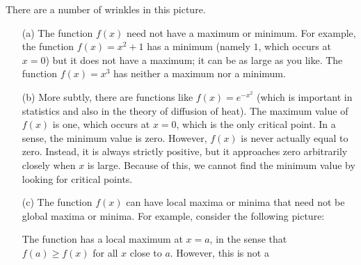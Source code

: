\documentclass[reqno]{amsart}
\theoremstyle{definition}
\begin{document}
There are a number of wrinkles in this picture.
\begin{itemize}
 \item[(a)] The function $f(x)$ need not have a maximum or minimum.
  For example, the function $f(x)=x^2+1$ has a minimum (namely $1$,
  which occurs at $x=0$) but it does not have a maximum; it can be as
  large as you like.  The function $f(x)=x^3$ has neither a maximum
  nor a minimum.
 \item[(b)] More subtly, there are functions like $f(x)=e^{-x^2}$
  (which is important in statistics and also in the theory of
  diffusion of heat).  The maximum value of $f(x)$ is one, which
  occurs at $x=0$, which is the only critical point.  In a sense, the
  minimum value is zero.  However, $f(x)$ is never actually equal to
  zero.  Instead, it is always strictly positive, but it approaches
  zero arbitrarily closely when $x$ is large.  Because of this, we
  cannot find the minimum value by looking for critical points.
  \begin{center}
  \end{center}
 \item[(c)] The function $f(x)$ can have local maxima or minima that
  need not be global maxima or minima.  For example, consider the
  following picture:
  \begin{center}
  \end{center}
  The function has a local maximum at $x=a$, in the sense that
  $f(a)\geq f(x)$ for all $x$ close to $a$.  However, this is not a

\end{itemize}
\end{document}
